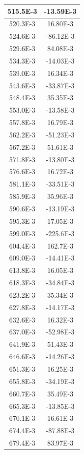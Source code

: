 \documentclass[english, 12pt, a4paper]{ifimaster}
\begin{document}
\begin{appendices}
\begin{center}
\begin{longtable}[htbp]{|c|c|}
\hline
  515.5E-3 & -13.59E-3 \\
\hline
  520.3E-3 & 16.80E-3 \\
\hline
  524.6E-3 & -86.12E-3 \\
\hline
  529.6E-3 & 84.08E-3 \\
\hline
  534.3E-3 & -14.03E-3 \\
\hline
  539.0E-3 & 16.34E-3 \\
\hline
  543.6E-3 & -33.87E-3 \\
\hline
  548.4E-3 & 35.35E-3 \\
\hline
  553.0E-3 & -13.58E-3 \\
\hline
  557.8E-3 & 16.79E-3 \\
\hline
  562.2E-3 & -51.23E-3 \\
\hline
  567.2E-3 & 51.61E-3 \\
\hline
  571.8E-3 & -13.80E-3 \\
\hline
  576.6E-3 & 16.72E-3 \\
\hline
  581.1E-3 & -33.51E-3 \\
\hline
  585.9E-3 & 35.96E-3 \\
\hline
  590.6E-3 & -13.19E-3 \\
\hline
  595.3E-3 & 17.05E-3 \\
\hline
  599.0E-3 & -225.6E-3 \\
\hline
  604.4E-3 & 162.7E-3 \\
\hline
  609.0E-3 & -14.41E-3 \\
\hline
  613.8E-3 & 16.05E-3 \\
\hline
  618.3E-3 & -34.84E-3 \\
\hline
  623.2E-3 & 35.34E-3 \\
\hline
  627.8E-3 & -14.17E-3 \\
\hline
  632.6E-3 & 16.32E-3 \\
\hline
  637.0E-3 & -52.98E-3 \\
\hline
  641.9E-3 & 51.43E-3 \\
\hline
  646.6E-3 & -14.26E-3 \\
\hline
  651.3E-3 & 16.25E-3 \\
\hline
  655.8E-3 & -34.19E-3 \\
\hline
  660.7E-3 & 35.49E-3 \\
\hline
  665.3E-3 & -13.85E-3 \\
\hline
  670.1E-3 & 16.61E-3 \\
\hline
  674.4E-3 & -87.88E-3 \\
\hline
  679.4E-3 & 83.97E-3 \\

\end{longtable}
\end{center}
\end{appendices}
\end{document}
